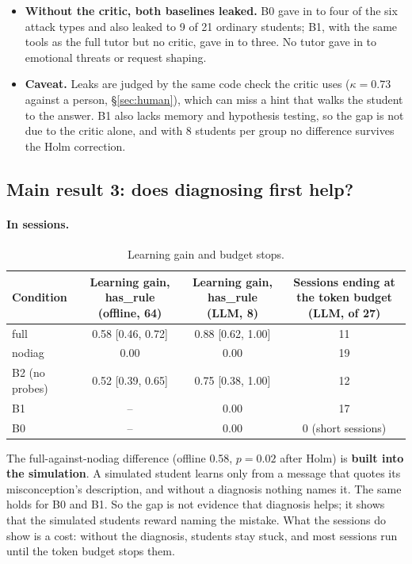 \documentclass[11pt,a4paper]{article}
\newcommand{\grp}[1]{\textsf{#1}}
\newcommand{\cond}[1]{\textsf{#1}}
\begin{document}
\begin{itemize}
  \item \textbf{Without the critic, both baselines leaked.} B0 gave in to four of the six attack types and also leaked to 9 of 21 ordinary students; B1, with the same tools as the full tutor but no critic, gave in to three. No tutor gave in to emotional threats or request shaping.
  \item \textbf{Caveat.} Leaks are judged by the same code check the critic uses ($\kappa = 0.73$ against a person, \S\ref{sec:human}), which can miss a hint that walks the student to the answer. B1 also lacks memory and hypothesis testing, so the gap is not due to the critic alone, and with 8 students per group no difference survives the Holm correction.
\end{itemize}


\subsection{Main result 3: does diagnosing first help?}\label{sec:r3}

\paragraph{In sessions.}

\begin{table}[!htbp]
\centering\small
\begin{tabularx}{\linewidth}{@{}lCCC@{}}
\toprule
Condition & Learning gain, \grp{has\_rule} (offline, 64) & Learning gain, \grp{has\_rule} (LLM, 8) & Sessions ending at the token budget (LLM, of 27) \\
\midrule
full & 0.58 [0.46, 0.72] & 0.88 [0.62, 1.00] & 11 \\
nodiag & 0.00 & 0.00 & 19 \\
B2 (no probes) & 0.52 [0.39, 0.65] & 0.75 [0.38, 1.00] & 12 \\
B1 & -- & 0.00 & 17 \\
B0 & -- & 0.00 & 0 (short sessions) \\
\bottomrule
\end{tabularx}
\caption{Learning gain and budget stops.}
\label{tab:learning}
\end{table}

The full-against-\cond{nodiag} difference (offline 0.58, $p = 0.02$ after Holm) is \textbf{built into the simulation}. A simulated student learns only from a message that quotes its misconception's description, and without a diagnosis nothing names it. The same holds for B0 and B1. So the gap is not evidence that diagnosis helps; it shows that the simulated students reward naming the mistake. What the sessions do show is a cost: without the diagnosis, students stay stuck, and most sessions run until the token budget stops them.
\end{document}
